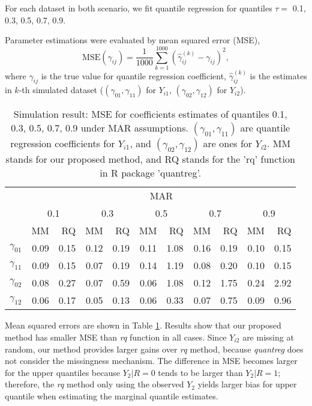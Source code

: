 \documentclass[12pt]{article}
\begin{document}
For each dataset in both scenario, we fit quantile regression for
quantiles $\tau =$ 0.1, 0.3, 0.5, 0.7, 0.9.

Parameter estimations were evaluated by mean squared error (MSE),
\begin{equation*}
  \text{MSE} (\gamma_{ij}) = \frac{1}{1000} \sum_{k = 1}^{1000} 
  \left( \hat{\gamma}_{ij}^{(k)}  - \gamma_{ij}\right)^2,
\end{equation*}
where $\gamma_{ij}$ is the true value for quantile regression
coefficient, $\hat{\gamma}_{ij}^{(k)}$ is the estimates in $k$-th
simulated dataset ($(\gamma_{01}, \gamma_{11})$ for $Y_{i1}$,
$(\gamma_{02}, \gamma_{12})$ for $Y_{i2}$).
 
\begin{table}[ht]
  \renewcommand{\arraystretch}{1.3}
  \centering
  \caption{Simulation result: MSE for coefficients estimates of quantiles
    0.1, 0.3, 0.5, 0.7, 0.9 under MAR assumptions. $(\gamma_{01}, \gamma_{11})$ 
    are quantile regression coefficients for $Y_{i1}$, and $(\gamma_{02}, \gamma_{12})$   
    are ones for $Y_{i2}$. MM stands for our proposed method, and RQ stands for the 'rq' 
    function in R package 'quantreg'.}\label{tab:simh2}  
  \vspace{10pt}
  \begin{tabular}{rrrrrrrrrrr}
    \toprule
    & \multicolumn{ 10}{c}{MAR} \\
    \cline{2-11}
    &  \multicolumn{2}{c}{0.1} &  \multicolumn{2}{c}{0.3} &  \multicolumn{2}{c}{0.5} &
    \multicolumn{2}{c}{0.7} &  \multicolumn{2}{c}{0.9} \\
    \cline{2-11}
    & MM & RQ    & MM & RQ    & MM & RQ    & MM & RQ    & MM & RQ \\
    \hline
    $\gamma_{01}$ & 0.09 & 0.15 & 0.12 & 0.19 & 0.11 & 1.08 & 0.16 & 0.19 & 0.10 & 0.15 \\ 
    $\gamma_{11}$ & 0.09 & 0.15 & 0.07 & 0.19 & 0.14 & 1.19 & 0.08 & 0.20 & 0.10 & 0.15 \\ 
    $\gamma_{02}$ & 0.08 & 0.27 & 0.07 & 0.59 & 0.06 & 1.08 & 0.12 & 1.75 & 0.24 & 2.92 \\ 
    $\gamma_{12}$ & 0.06 & 0.17 & 0.05 & 0.13 & 0.06 & 0.33 & 0.07 & 0.75 & 0.09 & 0.96 \\ 
    \bottomrule
  \end{tabular}
\end{table}
 
Mean squared errors are shown in Table \ref{tab:simh2}. Results show
that our proposed method has smaller MSE than \textit{rq} function in
all cases. Since $Y_{i2}$ are missing at random, our method provides
larger gains over \textit{rq} method, because \textit{quantreg} does
not consider the missingness mechanism.  The difference in MSE becomes
larger for the upper quantiles because $Y_2 |R = 0$ tends to be larger
than $Y_2 | R = 1$; therefore, the \textit{rq} method only using the
observed $Y_2$ yields larger bias for upper quantile when estimating
the marginal quantile estimates.
\end{document}
